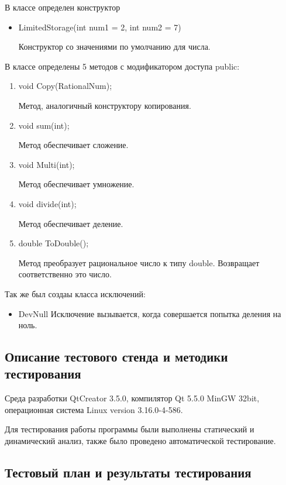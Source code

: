 \documentclass[12pt,a4paper]{report}
\begin{document}
	В классе определен конструктор 
\begin{itemize}

	\item LimitedStorage(int num1 = 2, int num2 = 7)
	
	Конструктор со значениями по умолчанию для числа. 
	
			
\end{itemize}	
В классе определены 5 методов с модификатором доступа public:		

\begin{enumerate}	
	\item void Copy(RationalNum);
	
	Метод, аналогичный конструктору копирования.
	
	\item void sum(int);
	
	Метод обеспечивает сложение. 
	
	\item void Multi(int);
	
	Метод обеспечивает умножение.
	
	\item void divide(int);
	
	Метод обеспечивает деление.
	
	\item double ToDouble();
	
	Метод преобразует рациональное число к типу double. Возвращает соответственно это число.
	
	

\end{enumerate}
	Так же был создаы класса исключений:
	
		\begin{itemize}
		\item DevNull
		Исключение вызывается, когда совершается попытка деления на ноль.
		\end{itemize}
		
		
\subsection{Описание тестового стенда и методики тестирования}
Среда разработки QtCreator 3.5.0, компилятор Qt 5.5.0 MinGW 32bit, операционная система Linux version 3.16.0-4-586.

Для тестирования работы программы были выполнены статический и динамический анализ, также было проведено автоматической тестирование.

\subsection{Тестовый план и результаты тестирования}
\end{document}
